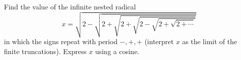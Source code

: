 Find the value of the infinite nested radical
\[
x=\sqrt{2-\sqrt{2+\sqrt{2+\sqrt{2-\sqrt{2+\sqrt{2+\cdots}}}}}}
\]
in which the signs repeat with period $-,+,+$ (interpret $x$ as the limit of the finite truncations). Express $x$ using a cosine.
